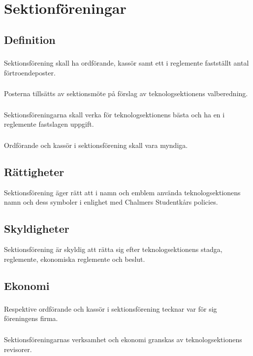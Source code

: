 \documentclass[a4paper, 10pt]{article}
\begin{document}
\section{Sektionföreningar}
\subsection{Definition}
\subsubsection{}
Sektionsförening skall ha ordförande, kassör samt ett i reglemente fastställt antal förtroendeposter.
\subsubsection{}
Posterna tillsätts av sektionsmöte på förslag av teknologsektionens valberedning.
\subsubsection{}
Sektionsföreningarna skall verka för teknologsektionens bästa och ha en i reglemente fastslagen uppgift.
\subsubsection{}
Ordförande och kassör i sektionsförening skall vara myndiga.
\subsection{Rättigheter}
Sektionsförening äger rätt att i namn och emblem använda teknologsektionens namn och dess symboler i enlighet med Chalmers Studentkårs policies.
\subsection{Skyldigheter}
Sektionsförening är skyldig att rätta sig efter teknologsektionens stadga, reglemente, ekonomiska reglemente och beslut.
\subsection{Ekonomi}
\subsubsection{}
Respektive ordförande och kassör i sektionsförening tecknar var för sig föreningens firma.
\subsubsection{}
Sektionsföreningarnas verksamhet och ekonomi granskas av teknologsektionens revisorer.
\end{document}
